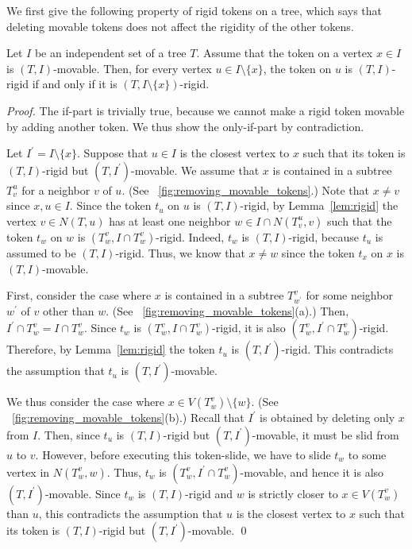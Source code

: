 \documentclass{llncs}
\newcommand{\Nei}[2]{N(#1,#2)}
\newcommand{\Tsub}[2]{T_{#1}^{#2}}
\newcommand{\bfI}{I}
\newcounter{one}
\begin{document}
	We first give the following property of rigid tokens on a tree, which says that deleting movable tokens does not affect the rigidity of the other tokens.
	\begin{lemma} \label{lem:removing-movable-tokens}
	Let $\bfI$ be an independent set of a tree $T$.
	Assume that the token on a vertex $x \in \bfI$ is $(T, \bfI)$-movable.
	Then, for every vertex $u \in I \setminus \{x\}$, the token on $u$ is $(T,\bfI)$-rigid if and only if it is $(T,\bfI \setminus \{x\})$-rigid.
	\end{lemma}
	\begin{proof}
	The if-part is trivially true, because we cannot make a rigid token movable by adding another token.
	We thus show the only-if-part by contradiction.

	Let $\bfI^\prime = \bfI \setminus \{x\}$.
	Suppose that $u \in \bfI$ is the closest vertex to $x$ such that its token is $(T,\bfI)$-rigid but $(T,\bfI^\prime)$-movable.
	We assume that $x$ is contained in a subtree $\Tsub{v}{u}$ for a neighbor $v$ of $u$. 
(See \figurename~\ref{fig:removing_movable_tokens}.)
	Note that $x \neq v$ since $x, u \in \bfI$.
	Since the token $t_u$ on $u$ is $(T, \bfI)$-rigid, by Lemma~\ref{lem:rigid} the vertex $v \in \Nei{T}{u}$ has at least one neighbor $w \in \bfI \cap \Nei{\Tsub{v}{u}}{v}$ such that the token $t_w$ on $w$ is $(\Tsub{w}{v}, \bfI \cap \Tsub{w}{v})$-rigid.
	Indeed, $t_w$ is $(T, \bfI)$-rigid, because $t_u$ is assumed to be $(T, \bfI)$-rigid.
	Thus, we know that $x \neq w$ since the token $t_x$ on $x$ is $(T, \bfI)$-movable.

	First, consider the case where $x$ is contained in a subtree $\Tsub{w^\prime}{v}$ for some neighbor $w^\prime$ of $v$ other than $w$. 
(See \figurename~\ref{fig:removing_movable_tokens}(a).)
	Then, $\bfI^\prime \cap \Tsub{w}{v} = \bfI \cap \Tsub{w}{v}$.
	Since $t_w$ is $(\Tsub{w}{v}, \bfI \cap \Tsub{w}{v})$-rigid, it is also $(\Tsub{w}{v}, \bfI^\prime \cap \Tsub{w}{v})$-rigid.
	Therefore, by Lemma~\ref{lem:rigid} the token $t_u$ is $(T,\bfI^\prime)$-rigid.
	This contradicts the assumption that $t_u$ is $(T,\bfI^\prime)$-movable.


	We thus consider the case where $x \in V(\Tsub{w}{v}) \setminus \{w\}$. 
(See \figurename~\ref{fig:removing_movable_tokens}(b).)
	Recall that $\bfI^\prime$ is obtained by deleting only $x$ from $\bfI$. 
	Then, since $t_u$ is $(T, \bfI)$-rigid but $(T, \bfI^\prime)$-movable, it must be slid from $u$ to $v$. 
	However, before executing this token-slide, we have to slide $t_w$ to some vertex in $\Nei{\Tsub{w}{v}}{w}$.
	Thus, $t_w$ is $(\Tsub{w}{v}, \bfI^\prime \cap \Tsub{w}{v})$-movable, and hence it is also $(T, \bfI^\prime)$-movable.
	Since $t_w$ is $(T, \bfI)$-rigid and $w$ is strictly closer to $x \in V(\Tsub{w}{v})$ than $u$, this contradicts the assumption that $u$ is the closest vertex to $x$ such that its token is $(T,\bfI)$-rigid but $(T,\bfI^\prime)$-movable.
\qed
\end{proof}
\end{document}
